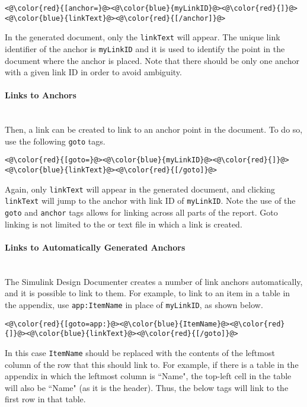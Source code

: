 \documentclass{article}
\makeatletter
\newcommand{\ToolName}{Simulink Design Documenter\@\xspace}
\makeatother
\begin{document}
\begin{lstlisting}
<@\color{red}{[anchor=}@><@\color{blue}{myLinkID}@><@\color{red}{]}@><@\color{blue}{linkText}@><@\color{red}{[/anchor]}@>
\end{lstlisting}

\noindent In the generated document, only the \verb|linkText| will appear. The unique link identifier of the anchor is \verb|myLinkID| and it is used to identify the point in the document where the anchor is placed. Note that there should be only one anchor with a given link ID in order to avoid ambiguity. 

\paragraph{Links to Anchors}~\\
Then, a link can be created to link to an anchor point in the document. To do so, use the following \verb|goto| tags.

\begin{lstlisting}
<@\color{red}{[goto=}@><@\color{blue}{myLinkID}@><@\color{red}{]}@><@\color{blue}{linkText}@><@\color{red}{[/goto]}@>
\end{lstlisting}
 
Again, only \verb|linkText| will appear in the generated document, and clicking \verb|linkText| will jump to the anchor with link ID of \verb|myLinkID|. Note the use of the \verb|goto| and \verb|anchor| tags allows for linking across all parts of the report. Goto linking is not limited to the  or text file in which a link is created.

\paragraph{Links to Automatically Generated Anchors}~\\
The \ToolName creates a number of link anchors automatically, and it is possible to link to them. For example, to link to an item in a table in the appendix, use \verb|app:ItemName| in place of \verb|myLinkID|, as shown below. 

\begin{lstlisting}
<@\color{red}{[goto=app:}@><@\color{blue}{ItemName}@><@\color{red}{]}@><@\color{blue}{linkText}@><@\color{red}{[/goto]}@>
\end{lstlisting}

\noindent In this case \verb|ItemName| should be replaced with the contents of the leftmost column of the row that this should link to. 
For example, if there is a table in the appendix in which the leftmost column is ``Name", the top-left cell in the table will also be ``Name" (as it is the header). Thus, the below tags will link to the first row in that table. 
\end{document}
